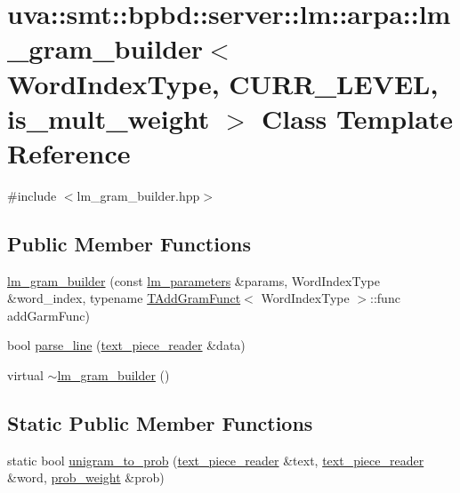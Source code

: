\hypertarget{classuva_1_1smt_1_1bpbd_1_1server_1_1lm_1_1arpa_1_1lm__gram__builder}{}\section{uva\+:\+:smt\+:\+:bpbd\+:\+:server\+:\+:lm\+:\+:arpa\+:\+:lm\+\_\+gram\+\_\+builder$<$ Word\+Index\+Type, C\+U\+R\+R\+\_\+\+L\+E\+V\+E\+L, is\+\_\+mult\+\_\+weight $>$ Class Template Reference}
\label{classuva_1_1smt_1_1bpbd_1_1server_1_1lm_1_1arpa_1_1lm__gram__builder}


{\ttfamily \#include $<$lm\+\_\+gram\+\_\+builder.\+hpp$>$}

\subsection*{Public Member Functions}
\begin{DoxyCompactItemize}
\item 
\hyperlink{classuva_1_1smt_1_1bpbd_1_1server_1_1lm_1_1arpa_1_1lm__gram__builder_aa5dc99da59bfc3886691c8a6257795d5}{lm\+\_\+gram\+\_\+builder} (const \hyperlink{structuva_1_1smt_1_1bpbd_1_1server_1_1lm_1_1lm__parameters}{lm\+\_\+parameters} \&params, Word\+Index\+Type \&word\+\_\+index, typename \hyperlink{structuva_1_1smt_1_1bpbd_1_1server_1_1lm_1_1arpa_1_1_t_add_gram_funct}{T\+Add\+Gram\+Funct}$<$ Word\+Index\+Type $>$\+::func add\+Garm\+Func)
\item 
bool \hyperlink{classuva_1_1smt_1_1bpbd_1_1server_1_1lm_1_1arpa_1_1lm__gram__builder_a3b1f70722faa01670b5218c750081283}{parse\+\_\+line} (\hyperlink{classuva_1_1utils_1_1file_1_1text__piece__reader}{text\+\_\+piece\+\_\+reader} \&data)
\item 
virtual \hyperlink{classuva_1_1smt_1_1bpbd_1_1server_1_1lm_1_1arpa_1_1lm__gram__builder_a3764e9353b665dc29858c5d6818bc1e1}{$\sim$lm\+\_\+gram\+\_\+builder} ()
\end{DoxyCompactItemize}
\subsection*{Static Public Member Functions}
\begin{DoxyCompactItemize}
\item 
static bool \hyperlink{classuva_1_1smt_1_1bpbd_1_1server_1_1lm_1_1arpa_1_1lm__gram__builder_a7aac83f48d04e9d890f9ca7a03b5121d}{unigram\+\_\+to\+\_\+prob} (\hyperlink{classuva_1_1utils_1_1file_1_1text__piece__reader}{text\+\_\+piece\+\_\+reader} \&text, \hyperlink{classuva_1_1utils_1_1file_1_1text__piece__reader}{text\+\_\+piece\+\_\+reader} \&word, \hyperlink{namespaceuva_1_1smt_1_1bpbd_1_1server_a01e9ea4de9c226f4464862e84ff0bbcc}{prob\+\_\+weight} \&prob)
\end{DoxyCompactItemize}
